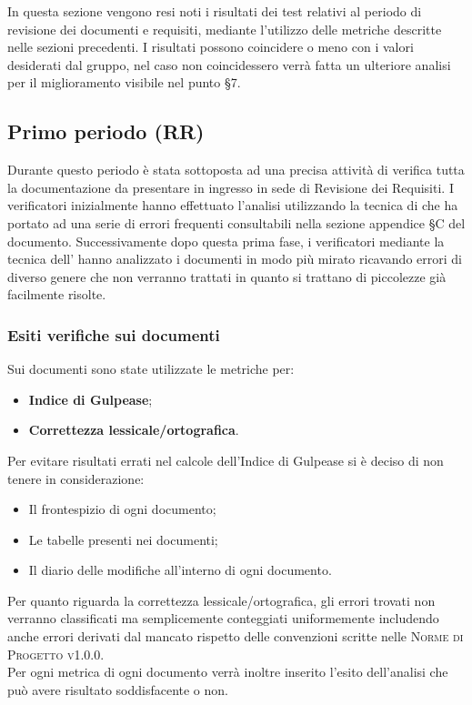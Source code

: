 \documentclass[../piano-di-qualifica.tex]{subfiles}
\begin{document}
In questa sezione vengono resi noti i risultati dei test relativi al periodo di revisione dei documenti e requisiti, mediante l'utilizzo delle metriche descritte nelle sezioni precedenti.
I risultati possono coincidere o meno con i valori desiderati dal gruppo, nel caso non coincidessero verrà fatta un ulteriore analisi per il miglioramento visibile nel punto §7.

\subsection{Primo periodo (RR)}
\label{sub:primo_periodo}
Durante questo periodo è stata sottoposta ad una precisa attività di verifica tutta la documentazione da presentare in ingresso in sede di Revisione dei Requisiti.
I verificatori inizialmente hanno effettuato l'analisi utilizzando la tecnica di  che ha portato ad una serie di errori frequenti consultabili nella sezione appendice §C del documento.
Successivamente dopo questa prima fase, i verificatori mediante la tecnica dell' hanno analizzato i documenti in modo più mirato ricavando errori di diverso genere che non verranno trattati in quanto si trattano di piccolezze già facilmente risolte.

\subsubsection{Esiti verifiche sui documenti}
\label{sub:esiti_verifiche_sui_documenti}
Sui documenti sono state utilizzate le metriche per:
    \begin{itemize}
        \item \textbf{Indice di Gulpease};
        \item \textbf{Correttezza lessicale/ortografica}.
    \end{itemize}
Per evitare risultati errati nel calcole dell'Indice di Gulpease si è deciso di non tenere in considerazione:
    \begin{itemize}
        \item Il frontespizio di ogni documento;
        \item Le tabelle presenti nei documenti;
        \item Il diario delle modifiche all'interno di ogni documento.
    \end{itemize}
Per quanto riguarda la correttezza lessicale/ortografica, gli errori trovati non verranno classificati ma semplicemente conteggiati uniformemente includendo anche errori derivati dal mancato rispetto delle convenzioni scritte nelle \textsc{Norme di Progetto v1.0.0}.
\\ Per ogni metrica di ogni documento verrà inoltre inserito l'esito dell'analisi che può avere risultato soddisfacente o non.
\end{document}
